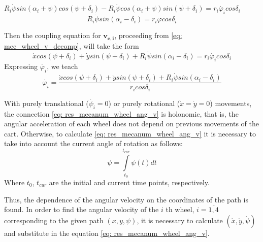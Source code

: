 \documentclass[oneside,final,14pt]{extreport}
\newcommand{\bs}{\boldsymbol}
\begin{document}
$
R_{i}
\dot{\psi}
sin (\alpha_{i} + \psi)
cos (\psi + \delta_{i})
-
R_{i}
\dot{\psi}
cos (\alpha_{i} + \psi)
sin (\psi + \delta_{i})
=
r_{i} \dot{\varphi_{i}}
cos \delta_{i}
$
\begin{equation}
R_{i}
\dot{\psi}
sin (\alpha_{i} - \delta_{i})
=
r_{i}
\dot{\varphi}
cos \delta_{i}
\end{equation}

Then the coupling equation for $ \bs{v_{c, i}} $, proceeding from \ref{eq: mec_wheel_v_decomp}, will take the form
\begin{equation}
\label{eq: res_mecanum_wheel_car}
\dot{x}
cos (\psi + \delta_{i})
+
\dot{y}
sin (\psi + \delta_{i})
+
R_{i}
\dot{\psi}
sin (\alpha_{i} - \delta_{i})
=
r_{i} \dot{\varphi_{i}}
cos \delta_{i}
\end{equation}
Expressing $ \dot{\varphi_{i}} $, we teach
\begin{equation}
\label{eq: res_mecanum_wheel_ang_v}
\dot{\varphi_{i}}
=
\frac{
\dot{x}
cos (\psi + \delta_{i})
+
\dot{y}
sin (\psi + \delta_{i})
+
R_{i}
\dot{\psi}
sin (\alpha_{i} - \delta_{i})
}
{
r_{i} cos \delta_{i}
}
\end{equation}

With purely translational ($ \dot{\psi_{i}} = 0 $) or purely rotational ($ \dot{x} = \dot{y} = 0 $) movements, the connection \ref{eq: res_mecanum_wheel_ang_v} is holonomic, that is, the angular acceleration of each wheel does not depend on previous movements of the cart. Otherwise, to calculate \ref{eq: res_mecanum_wheel_ang_v} it is necessary to take into account the current angle of rotation as follows:
\begin{equation}
\psi
=
\int \limits_{t_{0}} ^{t_{cur}} \psi (t) dt
\end{equation}
Where $ t_{0} $, $ t_{cur} $ are the initial and current time points, respectively.

Thus, the dependence of the angular velocity on the coordinates of the path is found. In order to find the angular velocity of the $ i $ th wheel, $ i = \overline{1,4} $ corresponding to the given path $ (x, y, \psi) $, it is necessary to calculate $ (\dot{x}, \dot{y}, \dot{\psi}) $ and substitute in the equation \ref{eq: res_mecanum_wheel_ang_v}.
\end{document}
